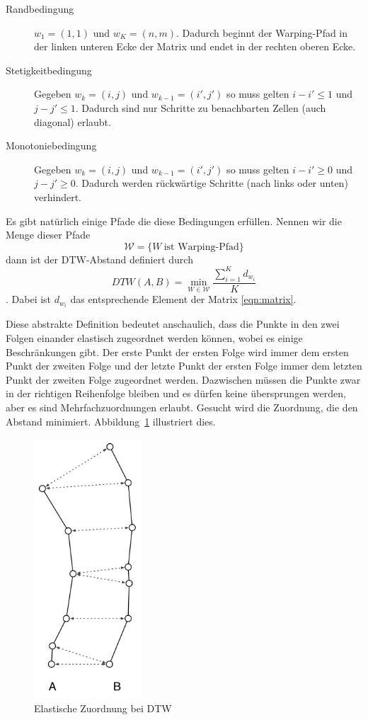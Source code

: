 \begin{description}
  \item[Randbedingung] \( w_1 = (1,1) \) und \( w_K = (n,m) \). Dadurch beginnt der Warping-Pfad in der linken unteren Ecke der Matrix und endet in der rechten oberen Ecke.
  \item[Stetigkeitbedingung] Gegeben \( w_k = (i,j) \) und \( w_{k-1} = (i',j') \) so muss gelten \( i-i' \leqslant 1 \) und \( j-j' \leqslant 1 \). Dadurch sind nur Schritte zu benachbarten Zellen (auch diagonal) erlaubt.
  \item[Monotoniebedingung] Gegeben \( w_k = (i,j) \) und \( w_{k-1} = (i',j') \) so muss gelten \( i-i' \geqslant 0 \) und \( j-j' \geqslant 0 \). Dadurch werden rückwärtige Schritte (nach links oder unten) verhindert.
\end{description}

Es gibt natürlich einige Pfade die diese Bedingungen erfüllen. Nennen wir die Menge dieser Pfade
\[ \mathcal{W}=\{W~\text{ist Warping-Pfad}\} \]
dann ist der DTW-Abstand definiert durch
\begin{equation}
  \label{eqn:dtw}
  DTW(A,B) = \min_{W \in \mathcal{W}}{\frac{\sum_{i=1}^K d_{w_i}}{K}}
\end{equation}
. Dabei ist \( d_{w_i} \) das entsprechende Element der Matrix \ref{eqn:matrix}.

Diese abstrakte Definition bedeutet anschaulich, dass die Punkte in den zwei Folgen einander elastisch zugeordnet werden können, wobei es einige Beschränkungen gibt. Der erste Punkt der ersten Folge wird immer dem ersten Punkt der zweiten Folge und der letzte Punkt der ersten Folge immer dem letzten Punkt der zweiten Folge zugeordnet werden. Dazwischen müssen die Punkte zwar in der richtigen Reihenfolge bleiben und es dürfen keine übersprungen werden, aber es sind Mehrfachzuordnungen erlaubt. Gesucht wird die Zuordnung, die den Abstand minimiert. Abbildung~\ref{fig:dtw} illustriert dies.

\begin{figure}
  \centering \includegraphics[width=4cm]{figures/dtw.png}
  \caption{Elastische Zuordnung bei DTW}
  \label{fig:dtw}
\end{figure}

